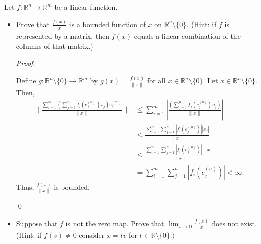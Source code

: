 \documentclass[12pt]{article}
\newenvironment{problem}[2][Problem]{\begin{trivlist}
\item[\hskip \labelsep {\bfseries #1}\hskip \labelsep {\bfseries
#2.}]}{\end{trivlist}}
\newenvironment{sol}
    {\emph{Proof.}
    }
    {
    \qed
    }
\begin{document}
\begin{problem}{3}
Let $f : \mathbb{R}^n \to \mathbb{R}^m$ be a linear function.
\begin{itemize}
\item[(a)]

Prove that $\frac{f(x)}{\lVert x \rVert}$ is a bounded function of $x$ on $\mathbb{R}^n \setminus \{0\}$. (Hint: if $f$ is represented by a matrix, then $f(x)$ equals a linear combination of the columns of that matrix.)

\vspace{1em}

\begin{sol}
Define $g:\mathbb{R}^n \setminus \{0\} \to \mathbb{R}^m$ by $g(x) = \frac{f(x)}{\lVert x \rVert}$ for all $x \in \mathbb{R}^n \setminus \{0\}$. Let $x \in \mathbb{R}^n \setminus \{0\}$. Then, \begin{align*}
\Bigg\lVert \frac{\sum_{i = 1}^m \left( \sum_{j = 1}^n f_i (e_j^{(n)})x_j\right)e_i^{(m)}}{\lVert x \rVert} \Bigg\rVert &\leq \sum_{i = 1}^m \left| \frac{\left( \sum_{j = 1}^n f_i(e_j^{(n)})x_j \right)}{\lVert x \rVert} \right| \\ &\leq \frac{\sum_{i = 1}^m \sum_{j = 1}^n \left| f_i(e_j^{(n)}) \right| \left| x_j \right|}{\lVert x \rVert} \\ &\leq \frac{\sum_{i = 1}^m \sum_{j = 1}^n \left| f_i(e_j^{(n)}) \right| \lVert x \rVert}{\lVert x \rVert} \\ &= \sum_{i = 1}^m \sum_{j = 1}^n \left| f_i(e_j^{(n)}) \right| < \infty.
\end{align*}
Thus, $\frac{f(x)}{\lVert x \rVert}$ is bounded.
\end{sol}

\item[(b)] Suppose that $f$ is not the zero map. Prove that $\lim_{x \to 0} \frac{f(x)}{\lVert x \rVert}$ does not exist. (Hint: if $f(v) \neq 0$ consider $x = tv$ for $t \in \mathbb{R} \setminus \{0\}.)$


\end{itemize}
\end{problem}
\end{document}
